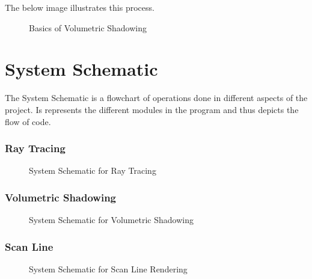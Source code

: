 \documentclass[paper=a4, fontsize=11pt]{scrartcl}
\numberwithin{equation}{section}		%
\numberwithin{figure}{section}			%
\numberwithin{table}{section}				%
\begin{document}
The below image illustrates this process.
\vspace{20pt}
\begin{figure}[h]
\centering
{}
\caption{Basics of Volumetric Shadowing}
\end{figure}
\newpage
\section{System Schematic}
The System Schematic is a flowchart of operations done in different aspects of the project. Is represents the different modules in the program and thus depicts the flow of code.

\subsubsection{Ray Tracing}
\vspace{20pt}
\begin{figure}[h]
\centering
{}
\caption{System Schematic for Ray Tracing}
\end{figure}
\newpage
\subsubsection{Volumetric Shadowing}
\vspace{20pt}
\begin{figure}[h]
\centering
{}
\caption{System Schematic for Volumetric Shadowing}
\end{figure}


\subsubsection{Scan Line}
\vspace{20pt}
\begin{figure}[h]
\centering
{}
\caption{System Schematic for Scan Line Rendering}
\end{figure}
\end{document}
